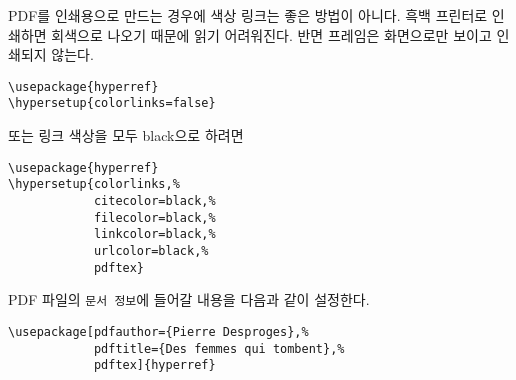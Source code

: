 \pagebreak[3]

PDF를 인쇄용으로 만드는 경우에 색상 링크는 좋은 방법이 아니다. 흑백 프린터로 인쇄하면 회색으로 나오기 때문에 읽기 어려워진다. 반면 프레임은 화면으로만 보이고 인쇄되지 않는다.
\begin{code}
\begin{verbatim}
\usepackage{hyperref}
\hypersetup{colorlinks=false}
\end{verbatim}
\end{code}
\noindent 또는 링크 색상을 모두 black으로 하려면
\begin{code}
\begin{verbatim}
\usepackage{hyperref}
\hypersetup{colorlinks,%
            citecolor=black,%
            filecolor=black,%
            linkcolor=black,%
            urlcolor=black,%
            pdftex}
\end{verbatim}
\end{code}

PDF 파일의 \texttt{문서 정보}에 들어갈 내용을 다음과 같이 설정한다.
\begin{code}
\begin{verbatim}
\usepackage[pdfauthor={Pierre Desproges},%
            pdftitle={Des femmes qui tombent},%
            pdftex]{hyperref}
\end{verbatim}
\end{code}

